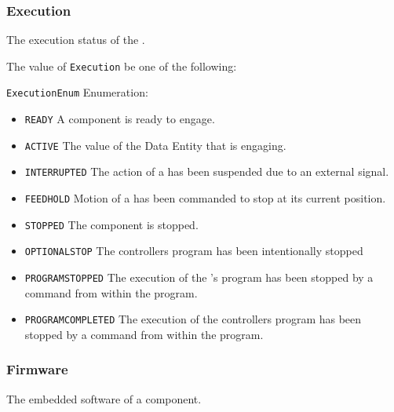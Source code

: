 \subsubsection{Execution}
\label{sec:Execution}



The execution status of the .


The value of \texttt{Execution} \MUST be one of the following: 


\texttt{ExecutionEnum} Enumeration:

\begin{itemize}
\item \texttt{READY} \newline A component is ready to engage. 
\item \texttt{ACTIVE} \newline The value of the \gls{Data Entity} that is engaging. 
\item \texttt{INTERRUPTED} \newline The action of a  has been suspended due to an external signal. 
\item \texttt{FEED\textunderscore HOLD} \newline Motion of a  has been commanded to stop at its current position. 
\item \texttt{STOPPED} \newline The component is stopped. 
\item \texttt{OPTIONAL\textunderscore STOP} \newline The controllers program has been intentionally stopped 
\item \texttt{PROGRAM\textunderscore STOPPED} \newline The execution of the 's program has been stopped by a command from within the program. 
\item \texttt{PROGRAM\textunderscore COMPLETED} \newline The execution of the controllers program has been stopped by a command from within the program. 
\end{itemize}



\subsubsection{Firmware}
\label{sec:Firmware}



The embedded software of a component.


